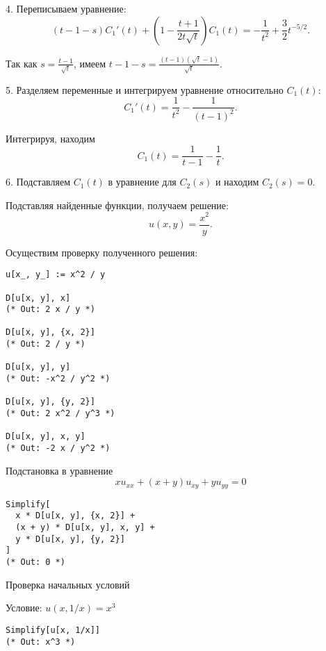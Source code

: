 \documentclass[a4paper,12pt]{article}
\begin{document}
4. Переписываем уравнение:
   \begin{equation*}
       (t - 1 - s) C_1'(t) + \left(1 - \frac{t + 1}{2t \sqrt{t}} \right) C_1(t) = -\frac{1}{t^2} + \frac{3}{2} t^{-5/2}.
   \end{equation*}
   
   Так как $ s = \frac{t - 1}{\sqrt{t}} $, имеем $ t - 1 - s = \frac{(t - 1)(\sqrt{t} - 1)}{\sqrt{t}} $.
   
5. Разделяем переменные и интегрируем уравнение относительно $ C_1(t) $:
   \begin{equation*}
       C_1'(t) = \frac{1}{t^2} - \frac{1}{(t - 1)^2}.
   \end{equation*}
   
   Интегрируя, находим
   \begin{equation*}
       C_1(t) = \frac{1}{t - 1} - \frac{1}{t}.
   \end{equation*}
   
6. Подставляем $ C_1(t) $ в уравнение для $ C_2(s) $ и находим $ C_2(s) = 0 $.

Подставляя найденные функции, получаем решение:
\begin{equation*}
    u(x,y) = \frac{x^2}{y}.
\end{equation*}

Осуществим проверку полученного решения:
\begin{lstlisting}[style=wolfram]
u[x_, y_] := x^2 / y

D[u[x, y], x]
(* Out: 2 x / y *)

D[u[x, y], {x, 2}]
(* Out: 2 / y *)

D[u[x, y], y]
(* Out: -x^2 / y^2 *)

D[u[x, y], {y, 2}]
(* Out: 2 x^2 / y^3 *)

D[u[x, y], x, y]
(* Out: -2 x / y^2 *)
\end{lstlisting}

Подстановка в уравнение
\[
x u_{xx} + (x+y) u_{xy} + y u_{yy}=0
\]

\begin{lstlisting}[style=wolfram]
Simplify[
  x * D[u[x, y], {x, 2}] + 
  (x + y) * D[u[x, y], x, y] + 
  y * D[u[x, y], {y, 2}]
]
(* Out: 0 *)
\end{lstlisting}

Проверка начальных условий

Условие: \( u(x, 1/x) = x^3 \)

\begin{lstlisting}[style=wolfram]
Simplify[u[x, 1/x]]
(* Out: x^3 *)
\end{lstlisting}
\end{document}
